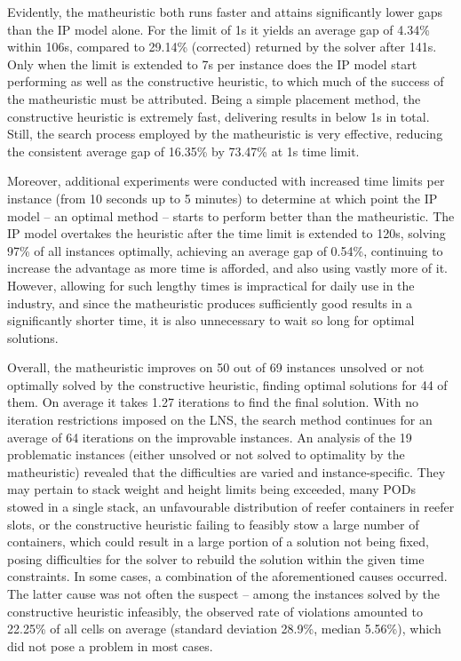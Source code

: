 \documentclass[preprint,11pt,3p]{elsarticle}
\begin{document}
Evidently, the matheuristic both runs faster and attains significantly lower gaps than the IP model alone. For the limit of 1s it yields an average gap of 4.34\% within 106s, compared to 29.14\% (corrected) returned by the solver after 141s. Only when the limit is extended to 7s per instance does the IP model start performing as well as the constructive heuristic, to which much of the success of the matheuristic must be attributed. Being a simple placement method, the constructive heuristic is extremely fast, delivering results in below 1s in total. Still, the search process employed by the matheuristic is very effective, reducing the consistent average gap of 16.35\% by 73.47\% at 1s time limit.

Moreover, additional experiments were conducted with increased time limits per instance (from 10 seconds up to 5 minutes) to determine at which point the IP model -- an optimal method -- starts to perform better than the matheuristic. The IP model overtakes the heuristic after the time limit is extended to 120s, solving 97\% of all instances optimally, achieving an average gap of 0.54\%, continuing to increase the advantage as more time is afforded, and also using vastly more of it. However, allowing for such lengthy times is impractical for daily use in the industry, and since the matheuristic produces sufficiently good results in a significantly shorter time, it is also unnecessary to wait so long for optimal solutions.

Overall, the matheuristic improves on 50 out of 69 instances unsolved or not optimally solved by the constructive heuristic, finding optimal solutions for 44 of them. On average it takes 1.27 iterations to find the final solution. With no iteration restrictions imposed on the LNS, the search method continues for an average of 64 iterations on the improvable instances. An analysis of the 19 problematic instances (either unsolved or not solved to optimality by the matheuristic) revealed that the difficulties are varied and instance-specific. They may pertain to stack weight and height limits being exceeded, many PODs stowed in a single stack, an unfavourable distribution of reefer containers in reefer slots, or the constructive heuristic failing to feasibly stow a large number of containers, which could result in a large portion of a solution not being fixed, posing difficulties for the solver to rebuild the solution within the given time constraints. In some cases, a combination of the aforementioned causes occurred. The latter cause was not often the suspect -- among the instances solved by the constructive heuristic infeasibly, the observed rate of violations amounted to 22.25\% of all cells on average (standard deviation 28.9\%, median 5.56\%), which did not pose a problem in most cases.
\end{document}
